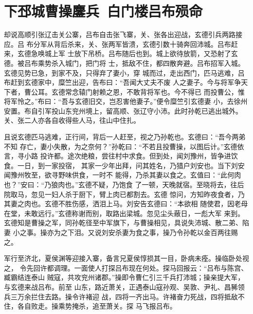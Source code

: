 \chapter{下邳城曹操鏖兵~白门楼吕布殒命}

却说高顺引张辽击关公寨，吕布自击张飞寨，关、张各出迎战，玄德引兵两路接应。吕
布分军从背后杀来，关、张两军皆溃，玄德引数十骑奔回沛城。吕布赶来，玄德急唤城上军
士放下吊桥。吕布随后也到。城上欲待放箭，又恐射了玄德。被吕布乘势杀入城门，把门将
士，抵敌不住，都四散奔避。吕布招军入城。玄德见势已急，到家不及，只得弃了妻小，穿
城而过，走出西门，匹马逃难，吕布赶到玄德家中，糜竺出迎，告布曰：“吾闻大丈夫不废
人之妻子。今与将军争天下者，曹公耳。玄德常念辕门射赖之恩，不敢背将军也。今不得已
而投曹公，惟将军怜之。”布曰：“吾与玄德旧交，岂忍害他妻子。”便令糜竺引玄德妻
小，去徐州安置。布自引军投山东兖州境上，留高顺、张辽守小沛。此时孙乾已逃出城外。
关、张二人亦各自收得些人马，往山中住扎。

且说玄德匹马逃难，正行间，背后一人赶至，视之乃孙乾也。玄德曰：“吾今两弟不知
存亡，妻小失散，为之奈何？”孙乾曰：“不若且投曹操，以图后计。”玄德依言，寻小路
投许都。途次绝粮，尝往村中求食。但到处，闻刘豫州，皆争进饮食。一日，到一家投宿，
其家一少年出拜，问其姓名，乃猎户刘安也。当下刘安闻豫州牧至，欲寻野味供食，一时不
能得，乃杀其妻以食之。玄值曰：“此何肉也？”安曰：“乃狼肉也。”玄德不疑，乃饱食
了一顿，天晚就宿。至晓将去，往后院取马，忽见一妇人杀于厨下，臂上肉已都割去。玄德
惊问，方知昨夜食者，乃其妻之肉也。玄德不胜伤感，洒泪上马。刘安告玄德曰：“本欲相
随使君，因老母在堂，未敢远行。”玄德称谢而别，取路出梁城。忽见尘头蔽日，一彪大军
来到。玄德知是曹操之军，同孙乾径至中军旗下，与曹操相见，具说失沛城、散二弟、陷妻
小之事。操亦为之下泪。又说刘安杀妻为食之事，操乃令孙乾以金百两往赐之。

军行至济北，夏侯渊等迎接入寨，备言兄夏侯惇损其一目，卧病未痊。操临卧处视之，
令先回许都调理。一面使人打探吕布现在何处。探马回报云：“吕布与陈宫、臧霸结连泰山
贼寇，共攻兖州诸郡。”操即令曹仁引三千兵打沛城；操亲提大军，与玄德来战吕布。前至
山东，路近萧关，正遇泰山寇孙观、吴敦、尹礼、昌豨领兵三万余拦住去路。操令许褚迎
战，四将一齐出马。许褚奋力死战，四将抵敌不住，各自败走。操乘势掩杀，追至萧关。探
马飞报吕布。

